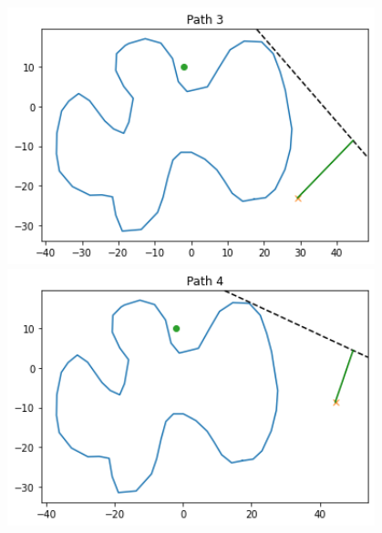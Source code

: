 \documentclass[11pt,landscape]{article}
\begin{document}
\begin{figure}[H]
\begin{mdframed}
\begin{center}
\begin{minipage}{0.3\textwidth}
            \end{minipage}
        \end{center}
        \begin{center}
            \begin{minipage}{0.3\textwidth}
                \includegraphics[width=0.95\textwidth]{p3.png}
            \end{minipage}
            \begin{minipage}{0.3\textwidth}
                \includegraphics[width=0.95\textwidth]{p4.png}
            \end{minipage}
            \begin{minipage}{0.3\textwidth}

\end{minipage}
\end{center}
\end{mdframed}
\end{figure}
\end{document}
